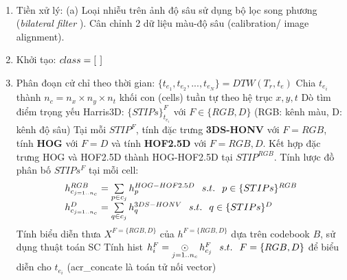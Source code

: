 \begin{algorithm}
{\begin{algorithmic}
	\Operation \\	
	\begin{enumerate}		
		\item Tiền xử lý: (a) Loại nhiễu trên ảnh độ sâu sử dụng bộ lọc song phương (\textit{bilateral filter} \cite{camplani_jbf}). Cân chỉnh 2 dữ liệu màu-độ sâu (calibration/ image alignment).
		\item Khởi tạo: $class = [\hspace{0.05in}]$
		\item Phân đoạn cử chỉ theo thời gian: $\{t_{e_1},t_{e_2},...,t_{e_N}\} = DTW(T_r,t_e)$
			\State Chia $t_{e_i}$ thành $n_c = n_x\times n_y\times n_t$ khối con (cells) tuần tự theo hệ trục $x,y,t$			
			\State Dò tìm điểm trọng yếu Harris3D\cite{Laptev_STIP}: $\{STIPs\}_{t_{e_i}}^F$ với $F \in \{RGB, D\}$ (RGB: kênh màu, D: kênh độ sâu) 			
			\State Tại mỗi $STIP^F$, tính đặc trưng \textbf{3DS-HONV} với $F=RGB$, tính \textbf{HOG} với $F=D$ và tính \textbf{HOF2.5D} với $F={RGB,D}$. Kết hợp đặc trưng HOG và HOF2.5D thành HOG-HOF2.5D tại $STIP^{RGB}$.
			\State Tính lược đồ phân bố $STIPs^F$ tại mỗi cell: 
			\begin{equation}
				\begin{array}{l}			
				h^{RGB}_{c_{j=1..n_c}} = \sum\limits_{p\in c_j} h_p^{HOG-HOF2.5D} \hspace{0.1in}s.t.\hspace{0.1in} p \in \{STIPs\}^{RGB}\\
				h^{D}_{c_{j=1..n_c}} = \sum\limits_{q\in c_j} h_q^{3DS-HONV} \hspace{0.1in}s.t.\hspace{0.1in} q \in \{STIPs\}^{D}				
				\end{array}				
			\end{equation}
			\State Tính biểu diễn thưa $X^{F=\{RGB,D\}}$ của $h^{F=\{RGB,D\}}$ dựa trên codebook $B$, sử dụng thuật toán SC
			\State Tính hist $h_i^{F} = \mathop  \odot \limits_{j = 1..{n_c}} h_{c_j}^{F} \hspace{0.1in}s.t.\hspace{0.1in} F=\{RGB,D\}$ để biểu diễn cho $t_{e_i}$ (\gls{acr_concate} là toán tử nối vector)

\end{enumerate}
\end{algorithmic}}
\end{algorithm}
